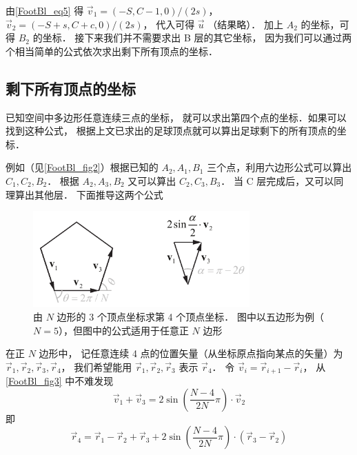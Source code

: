 由\autoref{FootBl_eq5} 得 $\vec v_1 = (-S, C-1, 0)/(2s)$， $\vec v_2 = (-S+s, C+c, 0)/(2s)$， 代入可得 $\vec u$ （结果略）． 加上 $A_2$ 的坐标，可得 $B_2$ 的坐标． 接下来我们并不需要求出 B 层的其它坐标， 因为我们可以通过两个相当简单的公式依次求出剩下所有顶点的坐标．

\subsection{剩下所有顶点的坐标}
已知空间中多边形任意连续三点的坐标， 就可以求出第四个点的坐标．如果可以找到这种公式， 根据上文已求出的足球顶点就可以算出足球剩下的所有顶点的坐标．

例如（见\autoref{FootBl_fig2}）根据已知的 $A_2, A_1, B_1$ 三个点，利用六边形公式可以算出 $C_1, C_2, B_2$． 根据 $A_2, A_3, B_2$ 又可以算出 $C_2, C_3, B_3$． 当 C 层完成后，又可以同理算出其他层． 下面推导这两个公式

\begin{figure}[ht]
\centering
\includegraphics[width=8.3cm]{./figures/FootBl3.pdf}
\caption{由 $N$ 边形的 3 个顶点坐标求第 4 个顶点坐标． 图中以五边形为例（$N = 5$），但图中的公式适用于任意正 $N$ 边形} \label{FootBl_fig3}
\end{figure}

在正 $N$ 边形中， 记任意连续 4 点的位置矢量（从坐标原点指向某点的矢量）为 $\vec r_1, \vec r_2, \vec r_3, \vec r_4$， 我们希望能用 $\vec r_1, \vec r_2, \vec r_3$ 表示 $\vec r_4$． 令 $\vec v_i = \vec r_{i+1} - \vec r_i$， 从\autoref{FootBl_fig3} 中不难发现
\begin{equation}
\vec v_1 + \vec v_3 = 2\sin(\frac{N-4}{2N}\pi) \cdot \vec v_2
\end{equation}
即
\begin{equation}
\vec r_4 = \vec r_1 - \vec r_2 + \vec r_3 + 2\sin(\frac{N-4}{2N}\pi) \cdot (\vec r_3  - \vec r_2)
\end{equation}








